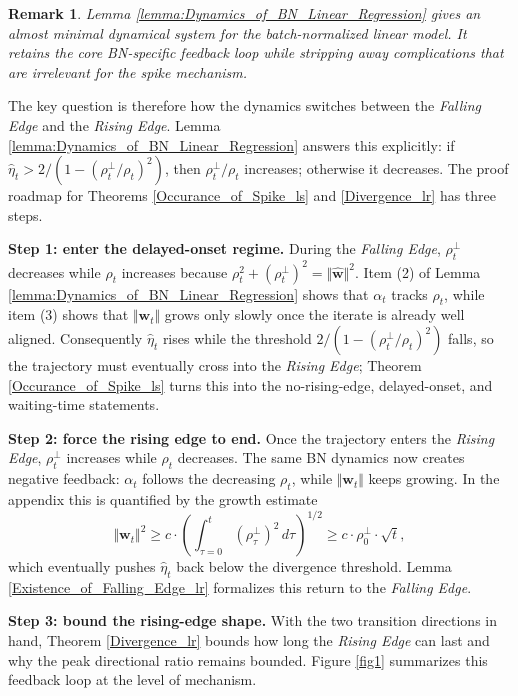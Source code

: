 \documentclass[pdflatex,sn-basic]{sn-jnl}%
\theoremstyle{thmstyleone}%
\newtheorem{remark}{Remark}%
\begin{document}
\begin{remark}
  Lemma \ref{lemma:Dynamics_of_BN_Linear_Regression} gives an almost minimal dynamical system for the batch-normalized linear model. It retains the core BN-specific feedback loop while stripping away complications that are irrelevant for the spike mechanism.
\end{remark}
The key question is therefore how the dynamics switches between the \textit{Falling Edge} and the \textit{Rising Edge}. Lemma \ref{lemma:Dynamics_of_BN_Linear_Regression} answers this explicitly: if $\hat{\eta}_t > {2}/{(1 - (\rho_t^{\perp} / \rho_t)^2)}$, then $\rho_t^{\perp} / \rho_t$ increases; otherwise it decreases. The proof roadmap for Theorems \ref{Occurance_of_Spike_ls} and \ref{Divergence_lr} has three steps.

\noindent\textbf{Step 1: enter the delayed-onset regime.}
During the \textit{Falling Edge}, $\rho_t^{\perp}$ decreases while $\rho_t$ increases because $\rho_t^2 + (\rho_t^{\perp})^2 = \Vert \hat{\mathbf{w}} \Vert^2$. Item (2) of Lemma \ref{lemma:Dynamics_of_BN_Linear_Regression} shows that $\alpha_t$ tracks $\rho_t$, while item (3) shows that $\Vert \mathbf{w}_t \Vert$ grows only slowly once the iterate is already well aligned. Consequently $\hat{\eta}_t$ rises while the threshold ${2}/{(1 - (\rho_t^{\perp} / \rho_t)^2)}$ falls, so the trajectory must eventually cross into the \textit{Rising Edge}; Theorem \ref{Occurance_of_Spike_ls} turns this into the no-rising-edge, delayed-onset, and waiting-time statements.

\noindent\textbf{Step 2: force the rising edge to end.}
Once the trajectory enters the \textit{Rising Edge}, $\rho_t^{\perp}$ increases while $\rho_t$ decreases. The same BN dynamics now creates negative feedback: $\alpha_t$ follows the decreasing $\rho_t$, while $\Vert \mathbf{w}_t \Vert$ keeps growing. In the appendix this is quantified by the growth estimate
\[
\Vert \mathbf{w}_t \Vert^2 
\geq c \cdot \left(\int_{\tau=0}^{t} \left(\rho_{\tau}^{\perp}\right)^2 \, d\tau\right)^{1/2}
\geq c \cdot \rho_0^{\perp} \cdot \sqrt{t},
\]
which eventually pushes $\hat{\eta}_t$ back below the divergence threshold. Lemma \ref{Existence_of_Falling_Edge_lr} formalizes this return to the \textit{Falling Edge}.

\noindent\textbf{Step 3: bound the rising-edge shape.}
With the two transition directions in hand, Theorem \ref{Divergence_lr} bounds how long the \textit{Rising Edge} can last and why the peak directional ratio remains bounded. Figure \ref{fig1} summarizes this feedback loop at the level of mechanism.
\end{document}
